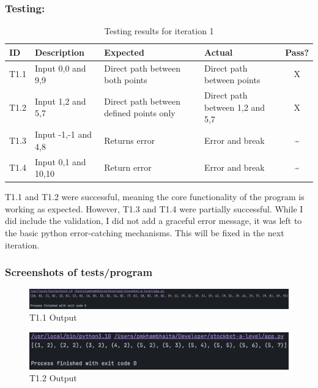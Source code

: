 \subsubsection{Testing:}
\begin{table}[htbp]
\centering
\begin{tabularx}{\textwidth}{|l|X|p{3.5cm}|p{3.5cm}|c|}
\hline
\textbf{ID} & \textbf{Description} & \textbf{Expected} & \textbf{Actual} & \textbf{Pass?} \\
\hline
T1.1 & Input 0,0 and 9,9 & Direct path between both points & Direct path between points & X \\
\hline
T1.2 & Input 1,2 and 5,7 & Direct path between defined points only & Direct path between 1,2 and 5,7 & X \\
\hline
T1.3 & Input -1,-1 and 4,8 & Returns error & Error and break & \~{} \\
\hline
T1.4 & Input 0,1 and 10,10 & Return error & Error and break & \~{} \\
\hline

\end{tabularx}
\caption{Testing results for iteration 1}
\end{table}
\textbf{}\newline
T1.1 and T1.2 were successful, meaning the core functionality of the program is working as expected. However, T1.3 and T1.4 were partially successful. While I did include the validation, I did not add a graceful error message, it was left to the basic python error-catching mechanisms. This will be fixed in the next iteration.

\newpage

\subsubsection{Screenshots of tests/program}

\begin{figure}[htbp!]
    \centering
    \includegraphics[width=1\linewidth]{Images/t1.1.png}
    \caption{T1.1 Output}
    \label{fig:enter-label}
\end{figure}

\begin{figure}[htbp!]
    \centering
    \includegraphics[width=1\linewidth]{Images/t1.2.png}
    \caption{T1.2 Output}
    \label{fig:enter-label}
\end{figure}


